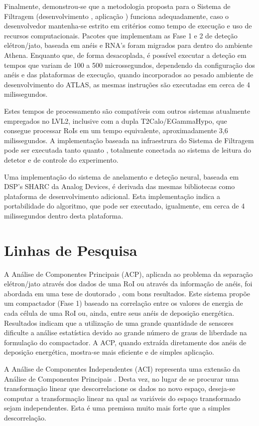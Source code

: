 Finalmente, demonstrou-se que a metodologia proposta para o Sistema de
Filtragem (desenvolvimento , aplicação ) funciona
adequadamente, caso o desenvolvedor mantenha-se estrito em critérios como
tempo de execução e uso de recursos computacionais. Pacotes que implementam as
Fase 1 e 2 de deteção elétron/jato, baseada em anéis e RNA's foram migrados
para dentro do ambiente Athena. Enquanto que, de forma desacoplada, é possível
executar a deteção em tempos que variam de 100 a 500 microssegundos,
dependendo da configuração dos anéis e das plataformas de execução, quando
incorporados ao pesado ambiente de desenvolvimento do ATLAS, as mesmas
instruções são executadas em cerca de 4 milissegundos.

Estes tempos de processamento são compatíveis com outros sistemas atualmente
empregados no LVL2, inclusive com a dupla T2Calo/EGammaHypo, que consegue
processar RoIs em um tempo equivalente, aproximadamente 3,6 milissegundos. A
implementação baseada na infraestrura do Sistema de Filtragem pode ser
executada tanto  quanto , totalmente conectada ao
sistema de leitura do detetor e de controle do experimento.

Uma implementação do sistema de anelamento e deteção neural, baseada em DSP's
SHARC da Analog Devices, é derivada das mesmas bibliotecas como plataforma de
desenvolvimento adicional. Esta implementação indica a portabilidade do
algoritmo, que pode ser executado, igualmente, em cerca de 4 milissegundos
dentro desta plataforma.

\section{Linhas de Pesquisa}

A Análise de Componentes Principais (ACP), aplicada ao problema da separação
elétron/jato através dos dados de uma RoI ou através da informação de anéis,
foi abordada em uma tese de doutorado \cite{herman}, com bons resultados. Este
sistema propõe um compactador (Fase 1) baseado na correlação entre os valores
de energia de cada célula de uma RoI ou, ainda, entre seus anéis de deposição
energética. Resultados indicam que a utilização de uma grande quantidade de
sensores dificulte a análise estatística devido ao grande número de graus de
liberdade na formulação do compactador. A ACP, quando extraída diretamente dos
anéis de deposição energética, mostra-se mais eficiente e de simples
aplicação.

A Análise de Componentes Independentes (ACI) representa uma extensão da
Análise de Componentes Principais \cite{oja-ica}. Desta vez, no lugar de se
procurar uma transformação linear que descorrelacione os dados no novo espaço,
deseja-se computar a transformação linear na qual as variáveis do espaço
transformado sejam independentes. Esta é uma premissa muito mais forte que
a simples descorrelação.

